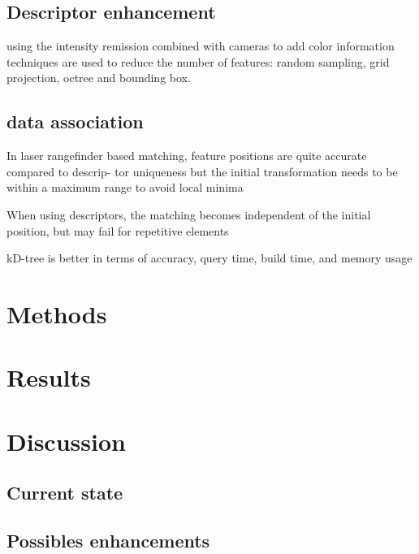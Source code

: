 \documentclass[twoside,twocolumn]{article}
\begin{document}
\subsection{Descriptor enhancement}

using the intensity remission
combined with cameras to add color information
techniques are used to reduce the number of features: random sampling, grid projection, octree and bounding box.

\subsection{data association}
In laser rangefinder based
matching, feature positions are quite accurate compared to descrip-
tor uniqueness but the initial transformation needs to be within
a maximum range to avoid local minima

When using descriptors, the
matching becomes independent of the initial position, but may fail for
repetitive elements


kD-tree is better in terms of accuracy, query time, build time,
and memory usage

\section{Methods}
\blindtext



\section{Results}
\blindtext


\section{Discussion}
\subsection{Current state}
\blindtext
\subsection{Possibles enhancements}
\blindtext

\printbibliography
\end{document}
